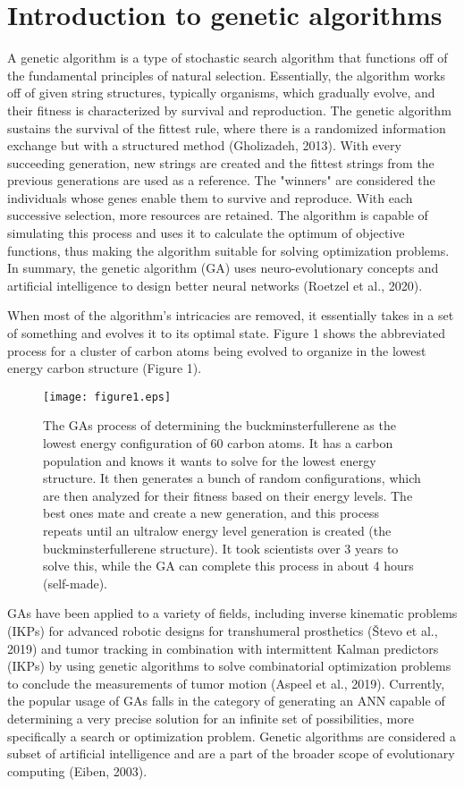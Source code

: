 \documentclass{JMLFS}
\begin{document}
\section{{Introduction to genetic algorithms}}
A genetic algorithm is a type of stochastic search algorithm that functions off of the fundamental principles of natural selection. Essentially, the algorithm works off of given string structures, typically organisms, which gradually evolve, and their fitness is characterized by survival and reproduction. The genetic algorithm sustains the survival of the fittest rule, where there is a randomized information exchange but with a structured method (Gholizadeh, 2013). With every succeeding generation, new strings are created and the fittest strings from the previous generations are used as a reference. The "winners" are considered the individuals whose genes enable them to survive and reproduce. With each successive selection, more resources are retained. The algorithm is capable of simulating this process and uses it to calculate the optimum of objective functions, thus making the algorithm suitable for solving optimization problems. In summary, the genetic algorithm (GA) uses neuro-evolutionary concepts and artificial intelligence to design better neural networks (Roetzel et al., 2020).

When most of the algorithm's intricacies are removed, it essentially takes in a set of something and evolves it to its optimal state. Figure 1 shows the abbreviated process for a cluster of carbon atoms being evolved to organize in the lowest energy carbon structure (Figure 1).

\begin{figure}[ht]
\centering
\texttt{[image: figure1.eps]}
\caption{The GAs process of determining the buckminsterfullerene as the lowest energy configuration of 60 carbon atoms. It has a carbon population and knows it wants to solve for the lowest energy structure. It then generates a bunch of random configurations, which are then analyzed for their fitness based on their energy levels. The best ones mate and create a new generation, and this process repeats until an ultralow energy level generation is created (the buckminsterfullerene structure). It took scientists over 3 years to solve this, while the GA can complete this process in about 4 hours (self-made).}
\end{figure}

GAs have been applied to a variety of fields, including inverse kinematic problems (IKPs) for advanced robotic designs for transhumeral prosthetics (Števo et al., 2019) and tumor tracking in combination with intermittent Kalman predictors (IKPs) by using genetic algorithms to solve combinatorial optimization problems to conclude the measurements of tumor motion (Aspeel et al., 2019). Currently, the popular usage of GAs falls in the category of generating an ANN capable of determining a very precise solution for an infinite set of possibilities, more specifically a search or optimization problem. Genetic algorithms are considered a subset of artificial intelligence and are a part of the broader scope of evolutionary computing (Eiben, 2003).
\end{document}
